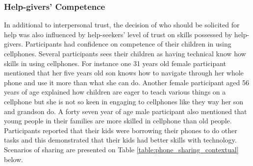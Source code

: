\subsubsection*{Help-givers' Competence}
In additional to interpersonal trust, the decision of who should be solicited for help was also influenced by help-seekers' level of trust on skills possessed by help-givers. Participants had confidence on competence of their children in using cellphones. Several participants sees their children as having technical know how skills in using cellphones. For instance one 31 years old female participant mentioned that her five years old son knows how to navigate through her whole phone and use it more than what she can do. Another female participant aged 56 years of age explained how children are eager to teach various things on a cellphone but she is not so keen in engaging to cellphones like they way her son and grandson do. A forty seven year of age male participant also mentioned that young people in their families are more skilled in cellphone than old people.
Participants reported that their kids were borrowing their phones to do other tasks and this demonstrated that their kids had better skills with technology. Scenarios of sharing are presented on Table \ref{table:phone_sharing_contextual} below. 

